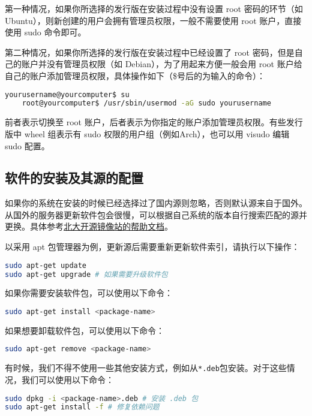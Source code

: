 \documentclass[../main.tex]{subfiles}
\begin{document}
第一种情况，如果你所选择的发行版在安装过程中没有设置 root 密码的环节（如 Ubuntu），则新创建的用户会拥有管理员权限，一般不需要使用 root 账户，直接使用 sudo 命令即可。

第二种情况，如果你所选择的发行版在安装过程中已经设置了 root 密码，但是自己的账户并没有管理员权限（如 Debian），为了用起来方便一般会用 root 账户给自己的账户添加管理员权限，具体操作如下（\$号后的为输入的命令）：

\begin{lstlisting}[language=bash]
    yourusername@yourcomputer$ su
    root@yourcomputer$ /usr/sbin/usermod -aG sudo yourusername
\end{lstlisting}

前者表示切换至 root 账户，后者表示为你指定的账户添加管理员权限。有些发行版中 wheel 组表示有 sudo 权限的用户组（例如Arch），也可以用 visudo 编辑 sudo 配置。

\subsection{软件的安装及其源的配置}

如果你的系统在安装的时候已经选择过了国内源则忽略，否则默认源来自于国外。从国外的服务器更新软件包会很慢，可以根据自己系统的版本自行搜索匹配的源并更换。具体参考\href{https://mirrors.pku.edu.cn/Help}{北大开源镜像站的帮助文档}。

以采用 apt 包管理器为例，更新源后需要重新更新软件索引，请执行以下操作：

\begin{lstlisting}[language=bash]
sudo apt-get update
sudo apt-get upgrade # 如果需要升级软件包
\end{lstlisting}

如果你需要安装软件包，可以使用以下命令：
\begin{lstlisting}[language=bash]
sudo apt-get install <package-name>
\end{lstlisting}

如果想要卸载软件包，可以使用以下命令：
\begin{lstlisting}[language=bash]
sudo apt-get remove <package-name>
\end{lstlisting}

有时候，我们不得不使用一些其他安装方式，例如从\texttt{*.deb}包安装。对于这些情况，我们可以使用以下命令：

\begin{lstlisting}[language=bash]
sudo dpkg -i <package-name>.deb # 安装 .deb 包
sudo apt-get install -f # 修复依赖问题
\end{lstlisting}
\end{document}
